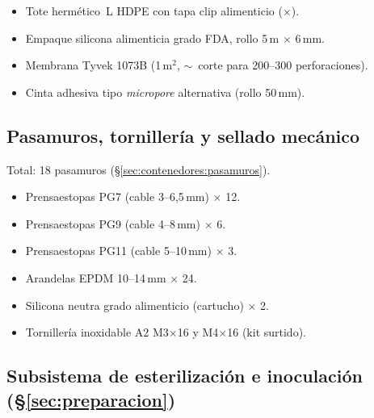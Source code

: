 \begin{itemize}[leftmargin=*,itemsep=0pt]
  \item Tote hermético \paramVolTote\,L HDPE con tapa clip alimenticio
        ($\times$\paramNcontenedores).
  \item Empaque silicona alimenticia grado FDA, rollo 5\,m $\times$ 6\,mm.
  \item Membrana Tyvek 1073B (1\,m$^2$, $\sim$~corte para 200--300 perforaciones).
  \item Cinta adhesiva tipo \emph{micropore} alternativa (rollo 50\,mm).
\end{itemize}

\subsection{Pasamuros, tornillería y sellado mecánico}
\label{sec:bom:pasamuros}

Total: 18 pasamuros (\S\ref{sec:contenedores:pasamuros}).

\begin{itemize}[leftmargin=*,itemsep=0pt]
  \item Prensaestopas PG7 (cable 3--6{,}5\,mm) $\times$ 12.
  \item Prensaestopas PG9 (cable 4--8\,mm) $\times$ 6.
  \item Prensaestopas PG11 (cable 5--10\,mm) $\times$ 3.
  \item Arandelas EPDM 10--14\,mm $\times$ 24.
  \item Silicona neutra grado alimenticio (cartucho) $\times$ 2.
  \item Tornillería inoxidable A2 M3$\times$16 y M4$\times$16 (kit surtido).
\end{itemize}

\subsection{Subsistema de esterilización e inoculación (\S\ref{sec:preparacion})}
\label{sec:bom:esterilizacion}

